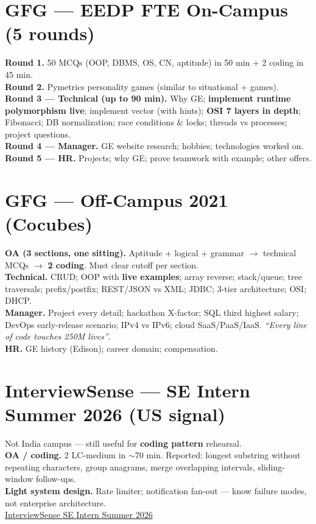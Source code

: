 \documentclass[11pt,a4paper]{article}
\newcommand{\rnd}[1]{\textcolor{accent}{\textbf{#1}}}
\newcommand{\q}[1]{\textcolor{qcol}{#1}}
\newcommand{\card}[1]{%
  \par\vspace{5pt}%
  \noindent\colorbox{soft}{%
    \parbox{\dimexpr\textwidth-2\fboxsep}{\vspace{6pt}#1\vspace{6pt}}%
  }\par\vspace{7pt}%
}
\begin{document}
\section{GFG --- EEDP FTE On-Campus (5 rounds)}
\card{
\rnd{Round 1.} 50 MCQs (OOP, DBMS, OS, CN, aptitude) in 50 min + 2 coding in 45 min.\\[3pt]
\rnd{Round 2.} Pymetrics personality games (similar to situational + games).\\[3pt]
\rnd{Round 3 --- Technical (up to 90 min).} Why GE; \textbf{implement runtime polymorphism live}; implement vector (with hints); \textbf{OSI 7 layers in depth}; Fibonacci; DB normalization; race conditions \& locks; threads vs processes; project questions.\\[3pt]
\rnd{Round 4 --- Manager.} GE website research; hobbies; technologies worked on.\\[3pt]
\rnd{Round 5 --- HR.} Projects; why GE; prove teamwork with example; other offers.
}

\section{GFG --- Off-Campus 2021 (Cocubes)}
\card{
\rnd{OA (3 sections, one sitting).} Aptitude + logical + grammar $\rightarrow$ technical MCQs $\rightarrow$ \textbf{2 coding}. Must clear cutoff per section.\\[4pt]
\rnd{Technical.} CRUD; OOP with \textbf{live examples}; array reverse; stack/queue; tree traversals; prefix/postfix; REST/JSON vs XML; JDBC; 3-tier architecture; OSI; DHCP.\\[4pt]
\rnd{Manager.} Project every detail; hackathon X-factor; SQL \q{third highest salary}; DevOps early-release scenario; IPv4 vs IPv6; cloud SaaS/PaaS/IaaS. \textit{``Every line of code touches 250M lives''}.\\[4pt]
\rnd{HR.} GE history (Edison); career domain; compensation.
}

\section{InterviewSense --- SE Intern Summer 2026 (US signal)}
\card{
Not India campus --- still useful for \textbf{coding pattern} rehearsal.\\[3pt]
\rnd{OA / coding.} 2 LC-medium in $\sim$70 min. Reported: \q{longest substring without repeating characters}, \q{group anagrams}, \q{merge overlapping intervals}, sliding-window follow-ups.\\[3pt]
\rnd{Light system design.} Rate limiter; notification fan-out --- know failure modes, not enterprise architecture.\\[3pt]
\href{https://www.interviewsense.org/opportunities/ge-healthcare-software-engineering-intern-summer-2026-salt-lake-city-ut/}{InterviewSense SE Intern Summer 2026}
}
\end{document}

